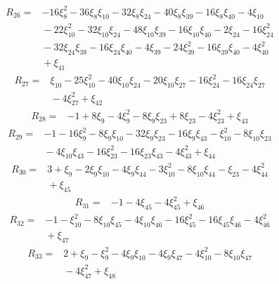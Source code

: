 \[
\begin{aligned}
 R_{26}={}&-16\xi_{8}^{2}-36\xi_{8}\xi_{10}-32\xi_{8}\xi_{24}-40\xi_{8}\xi_{39}-16\xi_{8}\xi_{40}-4\xi_{10}\\
 &{}-22\xi_{10}^{2}-32\xi_{10}\xi_{24}-48\xi_{10}\xi_{39}-16\xi_{10}\xi_{40}-2\xi_{24}-16\xi_{24}^{2}\\
 &{}-32\xi_{24}\xi_{39}-16\xi_{24}\xi_{40}-4\xi_{39}-24\xi_{39}^{2}-16\xi_{39}\xi_{40}-4\xi_{40}^{2}\\
 &{}+\xi_{41}
\end{aligned}
\]
\[
\begin{aligned}
 R_{27}={}&\xi_{10}-25\xi_{10}^{2}-40\xi_{10}\xi_{24}-20\xi_{10}\xi_{27}-16\xi_{24}^{2}-16\xi_{24}\xi_{27}\\
 &{}-4\xi_{27}^{2}+\xi_{42}
\end{aligned}
\]
\[
\begin{aligned}
 R_{28}={}&-1+8\xi_{9}-4\xi_{9}^{2}-8\xi_{9}\xi_{23}+8\xi_{23}-4\xi_{23}^{2}+\xi_{43}
\end{aligned}
\]
\[
\begin{aligned}
 R_{29}={}&-1-16\xi_{9}^{2}-8\xi_{9}\xi_{10}-32\xi_{9}\xi_{23}-16\xi_{9}\xi_{43}-\xi_{10}^{2}-8\xi_{10}\xi_{23}\\
 &{}-4\xi_{10}\xi_{43}-16\xi_{23}^{2}-16\xi_{23}\xi_{43}-4\xi_{43}^{2}+\xi_{44}
\end{aligned}
\]
\[
\begin{aligned}
 R_{30}={}&3+\xi_{9}-2\xi_{9}\xi_{10}-4\xi_{9}\xi_{44}-3\xi_{10}^{2}-8\xi_{10}\xi_{44}-\xi_{23}-4\xi_{44}^{2}\\
 &{}+\xi_{45}
\end{aligned}
\]
\[
\begin{aligned}
 R_{31}={}&-1-4\xi_{45}-4\xi_{45}^{2}+\xi_{46}
\end{aligned}
\]
\[
\begin{aligned}
 R_{32}={}&-1-\xi_{10}^{2}-8\xi_{10}\xi_{45}-4\xi_{10}\xi_{46}-16\xi_{45}^{2}-16\xi_{45}\xi_{46}-4\xi_{46}^{2}\\
 &{}+\xi_{47}
\end{aligned}
\]
\[
\begin{aligned}
 R_{33}={}&2+\xi_{9}-\xi_{9}^{2}-4\xi_{9}\xi_{10}-4\xi_{9}\xi_{47}-4\xi_{10}^{2}-8\xi_{10}\xi_{47}\\
 &{}-4\xi_{47}^{2}+\xi_{48}
\end{aligned}
\]
